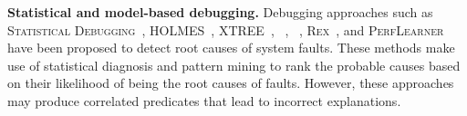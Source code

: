 
\noindent\textbf{Statistical and model-based debugging.}
Debugging approaches such as \textsc{Statistical Debugging}~\cite{song2014statistical}, 
\textsc{HOLMES}~\cite{chilimbi2009holmes}, \textsc{XTREE}~\cite{krishna2017less}, \bugdoc~\cite{lourencco2020bugdoc}, \encore~\cite{lourencco2020bugdoc}, \textsc{Rex}~\cite{mehta2020rex}, and \textsc{PerfLearner}~\cite{han2018perflearner} have been proposed to detect root causes of system faults. These methods make use of statistical diagnosis and pattern mining to rank the probable causes based on their likelihood of being the root causes of faults. However, these approaches may produce correlated predicates that lead to incorrect explanations.


